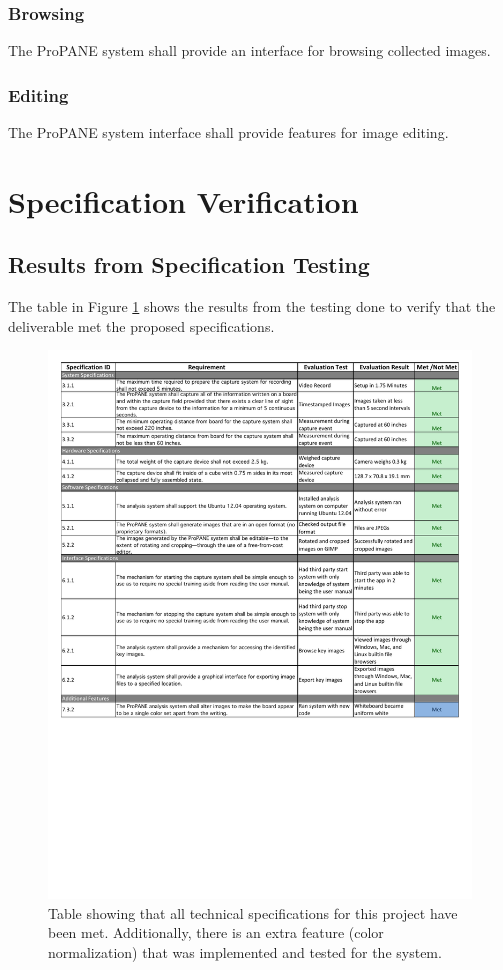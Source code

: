 \documentclass[]{article}
\begin{document}
			\subsubsection{Browsing}
				The ProPANE system shall provide an interface for browsing collected images.
				
			\subsubsection{Editing}
				The ProPANE system interface shall provide features for image editing.
				

	\section{Specification Verification}
	
	
	
		\subsection{Results from Specification Testing}
			The table in Figure \ref{fig:specreview} shows the results from the testing done to verify that the deliverable met the proposed specifications. 
			
			\begin{figure}
				\centering
				\includegraphics[scale=0.78]{images/technicalspecificationreview.pdf}	
				\caption{Table showing that all technical specifications for this project have been met. Additionally, there is an extra feature (color normalization) that was implemented and tested for the system.}	
				\label{fig:specreview}
			\end{figure}
			
\end{document}
